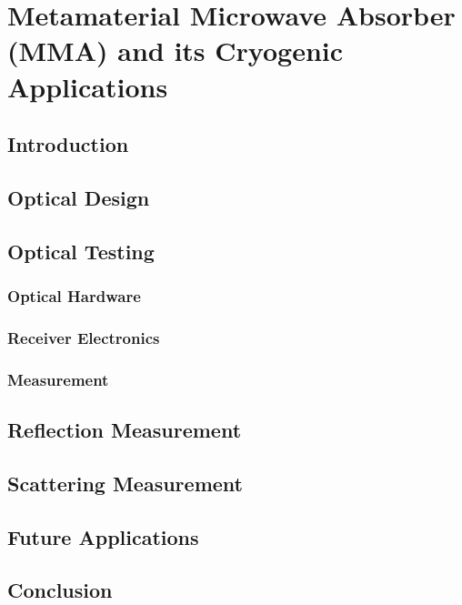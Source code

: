 \chapter{Metamaterial Microwave Absorber (MMA) and its Cryogenic Applications}

\section{Introduction}
\section{Optical Design}
\section{Optical Testing}
\subsection{Optical Hardware}
\subsection{Receiver Electronics}
\subsection{Measurement}
\section{Reflection Measurement}
\section{Scattering Measurement}
\section{Future Applications}
\section{Conclusion}